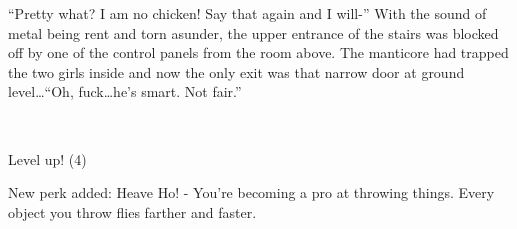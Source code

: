 ``Pretty what? I am no chicken! Say that again and I will-'' With the sound of metal being rent and torn asunder, the upper entrance of the stairs was blocked off by one of the control panels from the room above. The manticore had trapped the two girls inside and now the only exit was that narrow door at ground level\dots ``Oh, fuck\dots he's smart. Not fair.''

~\vfill

\begin{engnote}
Level up! (4)

New perk added: Heave Ho! - You're becoming a pro at throwing things. Every object you throw flies farther and faster.
\end{engnote}

